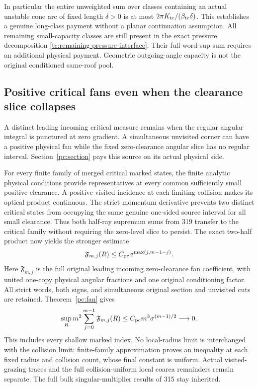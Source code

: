 In particular the entire unweighted sum over classes containing an
actual unstable cone arc of fixed length $\delta>0$ is at most
$2\pi K_{\rm tc}/(\beta_{\rm tc}\delta)$.
This establishes a genuine long-class payment without a planar
continuation assumption. All remaining small-capacity classes are
still present in the exact pressure decomposition
\eqref{tc:remaining-pressure-interface}. Their full word-sup sum
requires an additional physical payment. Geometric outgoing-angle
capacity is not the original conditioned same-roof pool.

\subsection*{Positive critical fans even when the clearance slice collapses}
A distinct leading incoming critical measure remains when the regular
angular integral is punctured at zero gradient. A simultaneous
unvisited corner can have a positive physical fan while the fixed
zero-clearance angular slice has no regular interval.
Section~\ref{pc:section} pays this source on its actual physical side.

For every finite family of merged critical marked states, the finite
analytic physical conditions provide representatives at every common
sufficiently small positive clearance. A positive visited incidence
at each limiting collision makes its optical product continuous.
The strict momentum derivative prevents two distinct critical states
from occupying the same genuine one-sided source interval for all
small clearance. Thus both half-ray supremum sums from 319 transfer
to the critical family without requiring the zero-level slice to persist.
The exact two-half product now yields the stronger estimate
\[
 \mathfrak F_{m,j}(R)\le C_{\rm pc}
          \sigma^{\max(j,m-1-j)}.
\]
Here $\mathfrak F_{m,j}$ is the full original leading incoming
zero-clearance fan coefficient, with united one-copy physical
angular fractions and one original conditioning factor.
All strict words, both signs, and simultaneous original section
and unvisited cuts are retained. Theorem~\ref{pc:fan} gives
\[
 \sup_R m^2\sum_{j=0}^{m-1}\mathfrak F_{m,j}(R)
       \le C_{\rm pc}m^3\sigma^{(m-1)/2}\longrightarrow0.
\]
This includes every shallow marked index. No local-radius limit is
interchanged with the collision limit: finite-family approximation
proves an inequality at each fixed radius and collision count, whose
final constant is uniform. Actual visited-grazing traces and the
full collision-uniform local coarea remainders remain separate.
The full bulk singular-multiplier results of 315 stay inherited.

